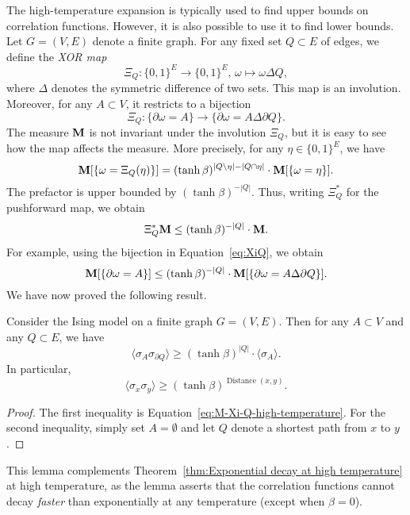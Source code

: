 The high-temperature expansion is typically used to find upper bounds on correlation
functions.
However, it is also possible to use it to find lower bounds.
Let $G=(V,E)$ denote a finite graph.
For any fixed set $Q\subset E$ of edges,
we define the \emph{XOR map}
\[
    \Xi_Q:\{0,1\}^E\to\{0,1\}^E,\,\omega\mapsto\omega\Delta Q,
\]
where $\Delta$ denotes the symmetric difference of two sets.
This map is an involution.
Moreover, for any $A\subset V$, it restricts to a bijection
\begin{equation}
    \label{eq:XiQ}
\Xi_Q:
\{\partial\omega=A\}\to\{\partial\omega=A\Delta\partial Q\}.
\end{equation}
The measure $\mathbf{M}$ is not invariant under the involution $\Xi_Q$,
but it is easy to see how the map affects the measure.
More precisely, for any $\eta\in\{0,1\}^E$, we have
\[
    \mathbf{M}[\{\omega = \Xi_Q(\eta)\}]
    =
    (\tanh\beta)^{|Q\setminus\eta|-|Q\cap\eta|}
    \cdot
    \mathbf{M}[\{\omega = \eta\}].
\]
The prefactor is upper bounded by $(\tanh\beta)^{-|Q|}$.
Thus, writing $\Xi_Q^*$ for the pushforward map,
we obtain
\[
    \Xi_Q^*\mathbf{M}\leq (\tanh\beta)^{-|Q|}
    \cdot
    \mathbf{M}.
\]
For example, using the bijection in Equation~\eqref{eq:XiQ},
we obtain
\begin{equation}
    \label{eq:M-Xi-Q-high-temperature}
    \bfM[\{\partial\omega=A\}]
    \leq
    (\tanh\beta)^{-|Q|}
    \cdot
    \bfM[\{\partial\omega=A\Delta\partial Q\}].
\end{equation}
We have now proved the following result.

\begin{lemma}
    \label{lemma:high-temperature}
    Consider the Ising model on a finite graph $G=(V,E)$.
    Then for any $A\subset V$ and any $Q\subset E$, we have
    \[
        \langle\sigma_A\sigma_{\partial Q}\rangle
        \geq
        (\tanh\beta)^{|Q|}\cdot\langle\sigma_A\rangle.
    \]
    In particular,
    \[
        \langle\sigma_x\sigma_y\rangle
        \geq
        (\tanh\beta)^{\operatorname{Distance}(x,y)}.
    \]
\end{lemma}

\begin{proof}
    The first inequality is Equation~\eqref{eq:M-Xi-Q-high-temperature}.
    For the second inequality, simply set $A=\emptyset$
    and let $Q$ denote a shortest path from $x$ to $y$.
\end{proof}

This lemma complements Theorem~\ref{thm:Exponential decay at high temperature}
at high temperature, as the lemma asserts that the correlation functions cannot
decay \emph{faster} than exponentially at any temperature
(except when $\beta=0$).

